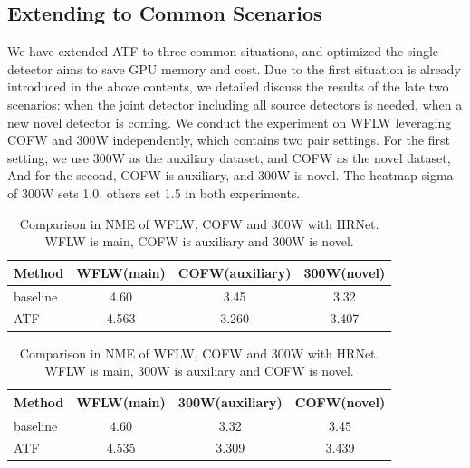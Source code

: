 \documentclass[journal,transmag]{IEEEtran}
\begin{document}
\subsection{Extending to Common Scenarios}
\label{extend experiments}
We have extended ATF to three common situations, and optimized the single detector aims to save GPU memory and cost.
Due to the first situation is already introduced in the above contents, we detailed discuss the results of the late two scenarios: when the joint detector including all source detectors is needed, when a new novel detector is coming.
We conduct the experiment on WFLW\cite{LABWFLW} leveraging COFW\cite{COFW} and 300W\cite{300W} independently, which contains two pair settings.
For the first setting, we use 300W\cite{300W} as the auxiliary dataset, and COFW\cite{COFW} as the novel dataset, 
And for the second, COFW\cite{COFW} is auxiliary, and 300W\cite{300W} is novel.
The heatmap sigma of 300W\cite{300W} sets 1.0, others\cite{LABWFLW,COFW} set 1.5 in both experiments.


\begin{table}[t]
\begin{center}
\begin{tabular}{|l|c|c|c|}
   \hline
   Method & WFLW(main) & COFW(auxiliary) & 300W(novel)  \\
   \hline\hline
   baseline\cite{HRNET} & 4.60 & 3.45 & 3.32 \\
   ATF & 4.563 & 3.260 & 3.407 \\
   \hline
\end{tabular}
\end{center}
\caption{Comparison in NME of WFLW, COFW and 300W with HRNet. WFLW is main, COFW is auxiliary and 300W is novel.}
\label{tab:anc3}
\end{table}


\begin{table}[t]
\begin{center}
\begin{tabular}{|l|c|c|c|}
   \hline
   Method & WFLW(main) & 300W(auxiliary) & COFW(novel)  \\
   \hline\hline
   baseline\cite{HRNET} & 4.60 & 3.32 & 3.45 \\
   ATF & 4.535 & 3.309 & 3.439 \\
   \hline
\end{tabular}
\end{center}
\caption{Comparison in NME of WFLW, COFW and 300W with HRNet. WFLW is main, 300W is auxiliary and COFW is novel.}
\label{tab:an3c}
\end{table}
\end{document}
